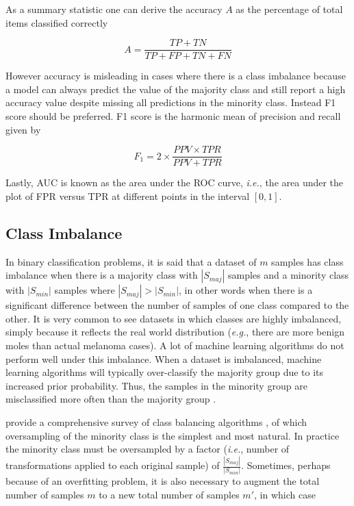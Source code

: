 As a summary statistic one can derive the accuracy $A$ as the percentage of total items classified correctly

\begin{equation}
A = \frac{TP + TN}{TP + FP + TN + FN}
\end{equation}

However accuracy is misleading in cases where there is a class imbalance because a model can always predict the value of the majority class and still report a high accuracy value despite missing all predictions in the minority class. Instead F1 score should be preferred. F1 score is the harmonic mean of precision and recall given by

\begin{equation}
F_1 = 2 \times \frac{PPV \times TPR}{PPV + TPR}
\end{equation}

Lastly, \ac{AUC} is known as the area under the \ac{ROC} curve, \textit{i.e.}, the area under the plot of \ac{FPR} versus \ac{TPR} at different points in the interval $[0, 1]$.

\subsection{Class Imbalance}

In binary classification problems, it is said that a dataset of $m$ samples has class imbalance when there is a majority class with $|S_{maj}|$ samples and a minority class with $|S_{min}|$ samples where $|S_{maj}| > |S_{min}|$, in other words when there is a significant difference between the number of samples of one class compared to the other. It is very common to see datasets in which classes are highly imbalanced, simply because it reflects the real world distribution (\textit{e.g.}, there are more benign moles than actual melanoma cases). A lot of machine learning algorithms do not perform well under this imbalance. When a dataset is imbalanced, machine learning algorithms will typically over-classify the majority group due to its increased prior probability. Thus, the samples in the minority group are misclassified more often than the majority group \cite{Johnson2019}.

\citeauthor{haibo2009} provide a comprehensive survey of class balancing algorithms \cite{haibo2009}, of which oversampling of the minority class is the simplest and most natural. In practice the minority class must be oversampled by a factor (\textit{i.e.}, number of transformations applied to each original sample) of $\frac{|S_{maj}|}{|S_{min}|}$. Sometimes, perhaps because of an overfitting problem, it is also necessary to augment the total number of samples $m$ to a new total number of samples $m'$, in which case


